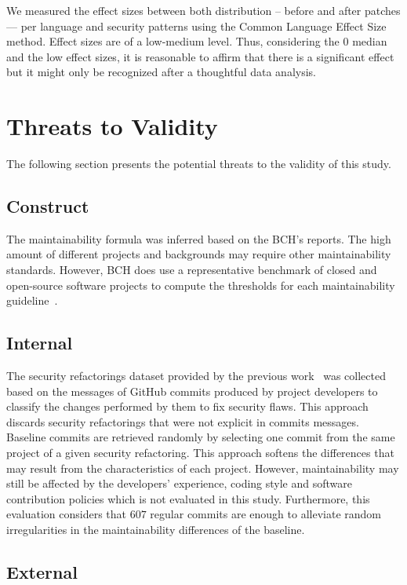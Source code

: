 \documentclass[sigconf,review]{acmart}
\begin{document}
We measured the effect sizes between both distribution -- before and after
patches --- per language and security patterns using the Common Language Effect
Size~\cite{cliff:1993} method. Effect sizes are of a low-medium level.
Thus, considering the $0$ median and the low effect sizes, it is reasonable
to affirm that there is a significant effect but it might only be
recognized after a thoughtful data analysis.


\section{Threats to Validity}\label{sec:threats}
%
The following section presents the potential threats to the validity of this
study.
%
\subsection{Construct}
%
The maintainability formula was inferred based on the BCH's reports. The high
amount of different projects and backgrounds may require other
maintainability standards. However, BCH does use a representative benchmark of
closed and open-source software projects to compute the
thresholds for each maintainability guideline~\cite{Visser:2016:OREILLY, Baggen2012}.

\subsection{Internal}

The security refactorings dataset provided by the previous
work~\cite{Reis:2017:IJSSE} was collected based on the messages of GitHub
commits produced by project developers to classify the changes performed by them
to fix security flaws. This approach discards security refactorings that were
not explicit in commits messages. Baseline commits are retrieved randomly by selecting one commit from the same
project of a given security refactoring. This approach softens the differences
that may result from the characteristics of each project. However,
maintainability may still be affected by the developers' experience, coding
style and software contribution policies which is not evaluated in this study.
Furthermore, this evaluation considers that $607$ regular commits are enough to
alleviate random irregularities in the maintainability differences of the
baseline.

\subsection{External}
\end{document}

